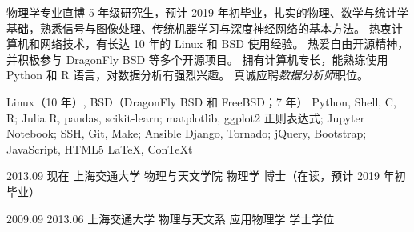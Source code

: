 \documentclass[zh]{resume}
\newcommand{\myposition}{数据分析师}
\begin{document}
\makeheader

{\onehalfspacing\hspace{1.7em}
物理学专业直博 5 年级研究生，预计 2019 年初毕业，扎实的物理、数学与统计学
基础，熟悉信号与图像处理、传统机器学习与深度神经网络的基本方法。
热衷计算机和网络技术，有长达 10 年的 Linux 和 BSD 使用经验。
热爱自由开源精神，并积极参与 DragonFly BSD 等多个开源项目。
拥有计算机专长，能熟练使用 Python 和 R 语言，对数据分析有强烈兴趣。
真诚应聘\emph{\myposition}职位。
\par}  %

\begin{competences}
    {Linux（10 年）, BSD（DragonFly BSD 和 FreeBSD；7 年）}
    {Python, Shell, C, R; Julia}
    {R, pandas, scikit-learn; matplotlib, ggplot2}
    {正则表达式; Jupyter Notebook; SSH, Git, Make; Ansible}
    {Django, Tornado; jQuery, Bootstrap; JavaScript, HTML5}
    {\LaTeX, Con\TeX{}t}
\end{competences}


\begin{educations}
  \education%
    {2013.09}%
    {现在}%
    {上海交通大学}%
    {物理与天文学院}%
    {物理学}%
    {博士（在读，预计 2019 年初毕业）}

  \separator{0.7em}
  \education%
    {2009.09}%
    {2013.06}%
    {上海交通大学}%
    {物理与天文系}%
    {应用物理学}%
    {学士学位}
\end{educations}
\end{document}
